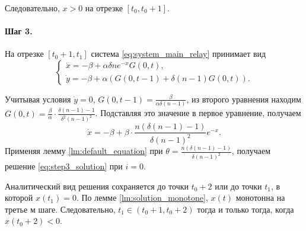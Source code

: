 Следовательно, $x > 0$ на отрезке $[t_0, t_0 + 1]$.

\paragraph{Шаг 3.} На отрезке $[t_0 + 1, t_1]$ система \eqref{eq:system_main_relay} принимает вид
\begin{equation}
	\label{eq:system_step3}
	\begin{cases}
		\dot{x} = -\beta + \alpha \delta n e^{-x} G(0, t),\\
		\dot{y} = -\beta + \alpha \left(G(0, t - 1) + \delta (n - 1) G(0, t)\right).
	\end{cases}
\end{equation}

Учитывая условия $\dot{y} = 0$, $G(0, t - 1) = \frac{\beta}{\alpha \delta (n - 1)}$, из второго уравнения находим $G(0, t) = \frac{\beta}{\alpha} \cdot \frac{\delta(n - 1) - 1}{\delta^2 (n - 1)^2}$. Подставляя это значение в первое уравнение, получаем
\[
\dot{x} = -\beta + \beta \cdot \dfrac{n (\delta(n - 1) - 1)}{\delta (n - 1)^2} e^{-x}.
\]
%
Применяя лемму \ref{lm:default_equation} при $\theta = \frac{n (\delta(n - 1) - 1)}{\delta (n - 1)^2}$, получаем решение \eqref{eq:step3_solution} при $i = 0$.

Аналитический вид решения сохраняется до точки $t_0 + 2$ или до точки $t_1$, в которой $x(t_1) = 0$. По лемме \ref{lm:solution_monotone}, $x(t)$ монотонна на третье	м шаге. Следовательно, $t_1 \in (t_0 + 1, t_0 + 2)$ тогда и только тогда, когда $x(t_0 + 2) < 0$.

